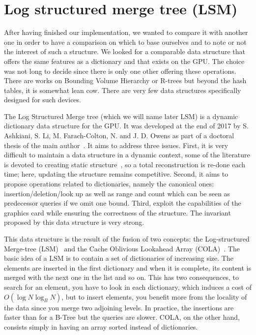 
\section{Log structured merge tree (LSM)}

After having finished our implementation, we wanted to compare it with another one in order to have a comparison on which to base ourselves and to note or not the interest of such a structure. We looked for a comparable data structure that offers the same features as a dictionary and that exists on the GPU. The choice was not long to decide since there is only one other offering these operations. There are works on Bounding Volume Hierarchy or R-trees but beyond the hash tables, it is somewhat lean cow. There are very few data structures specifically designed for such devices.

The Log Structured Merge tree (which we will name later LSM) is a dynamic dictionary data structure for the GPU. It was developed at the end of 2017 by S. Ashkiani, S. Li, M. Farach-Colton, N. and J. D. Owens as part of a doctoral thesis of the main author~\cite{ashkiani2017parallel}. It aims to address three issues. First, it is very difficult to maintain a data structure in a dynamic context, some of the literature is devoted to creating static structure~\cite{alcantara2011building, popov2007stackless}, so a total reconstruction is re-done each time; here, updating the structure remains competitive. Second, it aims to propose operations related to dictionaries, namely the canonical ones: insertion/deletion/look up as well as range and count which can be seen as predecessor queries if we omit one bound. Third, exploit the capabilities of the graphics card while ensuring the correctness of the structure. The invariant proposed by this data structure is very strong.

This data structure is the result of the fusion of two concepts: the Log-structured Merge-tree (LSM)~\cite{o1996log} and the Cache Oblivious Lookahead Array (COLA)~\cite{bender2007cache}. The basic idea of a LSM is to contain a set of dictionaries of increasing size. The elements are inserted in the first dictionary and when it is complete, its content is merged with the next one in the list and so on. This has two consequences, to search for an element, you have to look in each dictionary, which induces a cost of $O(\log N \log_{B} N)$, but to insert elements, you benefit more from the locality of the data since you merge two adjoining levels. In practice, the insertions are faster than for a B-Tree but the queries are slower. COLA, on the other hand, consists simply in having an array sorted instead of dictionaries.

